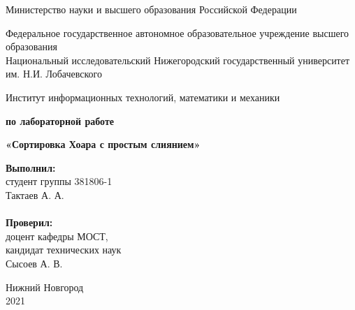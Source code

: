 \documentclass{report}
\begin{document}
\begin{titlepage}

\begin{center}
Министерство науки и высшего образования Российской Федерации
\end{center}

\begin{center}
Федеральное государственное автономное образовательное учреждение высшего образования \\
Национальный исследовательский Нижегородский государственный университет им. Н.И. Лобачевского
\end{center}

\begin{center}
Институт информационных технологий, математики и механики
\end{center}

\vspace{4em}

\begin{center}
\textbf{ по лабораторной работе} \\
\end{center}
\begin{center}
\textbf{\Large«Сортировка Хоара с простым слиянием»} \\
\end{center}

\vspace{4em}

\newbox{\lbox}
\newlength{\maxl}
\setlength{\maxl}{\wd\lbox}
\hfill\parbox{7cm}{
\hspace*{5cm}\hspace*{-5cm}\textbf{Выполнил:} \\ студент группы 381806-1 \\ Тактаев А. А.\\
\\
\hspace*{5cm}\hspace*{-5cm}\textbf{Проверил:}\\ доцент кафедры МОСТ, \\ кандидат технических наук \\ Сысоев А. В.\\
}
\vspace{\fill}

\begin{center} Нижний Новгород \\ 2021 \end{center}

\end{titlepage}
\end{document}
